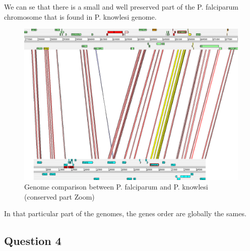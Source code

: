 \documentclass[]{article}
\theoremstyle{definition}
\begin{document}
We can se that there is a small and well preserved part of the P. falciparum chromosome that is found in P. knowlesi genome.
 \begin{figure}[H]
	\centering
	\includegraphics*[scale=0.3]{image/q3.png}
	\caption{ Genome comparison between P. falciparum and P. knowlesi (conserved part Zoom)}
\end{figure}

In that particular part of the genomes, the genes order are globally the sames.

\subsection{Question 4}
\end{document}
